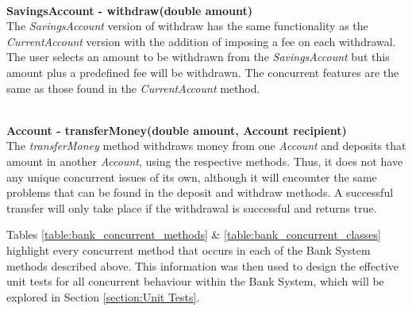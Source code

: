 \documentclass[a4paper,12pt]{article}
\begin{document}
\textbf{\\SavingsAccount - withdraw(double amount)}
\\The \textit{SavingsAccount} version of withdraw has the same functionality as the \textit{CurrentAccount} version with the addition of imposing a fee on each withdrawal. The user selects an amount to be withdrawn from the \textit{SavingsAccount} but this amount plus a predefined fee will be withdrawn. The concurrent features are the same as those found in the \textit{CurrentAccount} method.



\textbf{\\Account - transferMoney(double amount, Account recipient)}
\\The \textit{transferMoney} method withdraws money from one \textit{Account} and deposits that amount in another \textit{Account}, using the respective methods. Thus, it does not have any unique concurrent issues of its own, although it will encounter the same problems that can be found in the deposit and withdraw methods. A successful transfer will only take place if the withdrawal is successful and returns true.

Tables \ref{table:bank_concurrent_methods} \& \ref{table:bank_concurrent_classes} highlight every concurrent method that occurs in each of the Bank System methods described above. This information was then used to design the effective unit tests for all concurrent behaviour within the Bank System, which will be explored in Section \ref{section:Unit Tests}.
\end{document}

